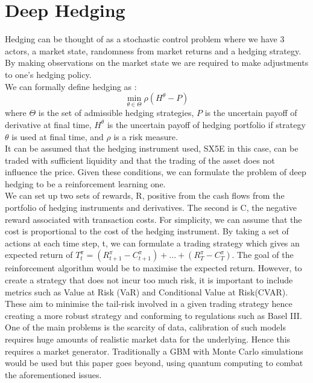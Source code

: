 \documentclass[12pt]{article}
\numberwithin{equation}{section}
\begin{document}
\clearpage
\section{Deep Hedging}

Hedging can be thought of as a stochastic control problem where we have 3 actors, 
a market state, randomness from market returns and a hedging strategy. By making 
observations on the market state we are required to make adjustments to one's
hedging policy. 
\\
We can formally define hedging as :
$$\min_{\theta \in \Theta} \rho (H^\theta - P)$$
where $\Theta$ is the set of admissible hedging strategies, $P$ is the uncertain 
payoff of derivative at final time, $H^\theta$ is the uncertain payoff of hedging 
portfolio if strategy $\theta$ is used at final time, and $\rho$ is a risk measure.
\\
It can be assumed that the hedging instrument used, SX5E in this case, can be 
traded with sufficient liquidity and that the trading of the asset does not 
influence the price. Given these conditions, we can formulate the problem of deep 
hedging to be a reinforcement learning one. 
\\
We can set up two sets of rewards, R, positive from the cash flows from the 
portfolio of hedging instruments and derivatives. The second is C, the negative 
reward associated with transaction costs. For simplicity, we can assume that the 
cost is proportional to the cost of the hedging instrument. By taking a set of 
actions at each time step, t, we can formulate a trading strategy which gives an 
expected return of
$T^\pi_t = (R^\pi_{t+1} - C^\pi_{t+1} )+ ... +(R^\pi_T - C^\pi_T)$.
The goal of the reinforcement algorithm would be to maximise the expected return. 
However, to create a strategy that does not incur too much risk, it is important 
to include metrics such as Value at Risk (VaR) and Conditional Value at Risk(CVAR).
These aim to minimise the tail-risk involved in a given trading strategy hence 
creating a more robust strategy and conforming to regulations such as Basel III.
\cite{The New International Regulation of Market Risk}
\\
One of the main problems is the scarcity of data, calibration of such models 
requires huge amounts of realistic market data for the underlying. Hence this
requires a market generator. Traditionally a GBM with Monte Carlo simulations 
would be used but this paper goes beyond, using quantum computing to combat the 
aforementioned issues. 
\\
\end{document}
